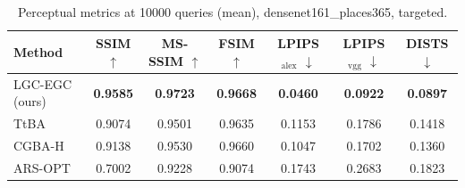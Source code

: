 \begin{table}[t]
\centering\footnotesize
\caption{Perceptual metrics at 10000 queries (mean), densenet161\_places365, targeted.}
\begin{tabular}{lcccccc}
\toprule
Method & SSIM $\uparrow$ & MS-SSIM $\uparrow$ & FSIM $\uparrow$ & LPIPS$_{\mathrm{alex}}$ $\downarrow$ & LPIPS$_{\mathrm{vgg}}$ $\downarrow$ & DISTS $\downarrow$ \\
\midrule
LGC-EGC (ours) & \textbf{0.9585} & \textbf{0.9723} & \textbf{0.9668} & \textbf{0.0460} & \textbf{0.0922} & \textbf{0.0897} \\
TtBA & 0.9074 & 0.9501 & 0.9635 & 0.1153 & 0.1786 & 0.1418 \\
CGBA-H & 0.9138 & 0.9530 & 0.9660 & 0.1047 & 0.1702 & 0.1360 \\
ARS-OPT & 0.7002 & 0.9228 & 0.9074 & 0.1743 & 0.2683 & 0.1823 \\
\bottomrule
\end{tabular}
\end{table}
